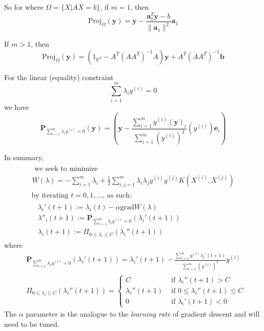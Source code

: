 \documentclass[10pt]{amsart}
\begin{document}
\begin{multicols*}{2}
So for where $\Omega = \lbrace X | AX = b \rbrace$, if $m=1$, then
\[
\text{Proj}_{\Omega}(\mathbf{y}) = \mathbf{y} - \frac{\mathbf{a}_1^T \mathbf{y} - b}{ \| \mathbf{a}_1 \|^2 } \mathbf{a}_1
\]

If $m>1$, then
\[
\text{Proj}_{\Omega}(\mathbf{y}) = (1_{\mathbb{R}^d} - A^T(AA^T)^{-1}A)\mathbf{y}+A^T(AA^T)^{-1}\mathbf{b}
\]

For the linear (equality) constraint
\[
\sum_{i=1}^m \lambda_iy^{(i)} = 0 
\]
we have
\begin{equation}
  \mathbf{P}_{\sum_{i=1}^m\lambda_iy^{(i)} = 0 }(\mathbf{y}) = \left( \mathbf{y} - \frac{ \sum_{i=1}^m y^{(i)} (\mathbf{y})_i }{ \sum_{i=1}^m (y^{(i)})^2 } (y^{(i)})\mathbf{e}_i \right)
  \end{equation}


In summary,
\begin{equation}\label{Eq:DualFormulationW}
\boxed{ \begin{gathered}
  \begin{gathered}
    \text{ we seek to minimize } \\
    W(\lambda) = - \sum_{i=1}^m \lambda_i + \frac{1}{2} \sum_{i,j=1}^m \lambda_i \lambda_j y^{(i)} y^{(j)} K(X^{(i)},X^{(j)}) 
  \end{gathered} \\
  \text{  by iterating $t=0,1,\dots $, as such: } \\
  \begin{aligned}
    & \lambda_i'(t+1):=\lambda_i(t) - \alpha \text{grad}{ W(\lambda) } \\ 
    & \lambda''_i(t+1):= \mathbf{P}_{\sum_{i=1}^m \lambda_i y^{(i)} = 0 }( \lambda_i'(t+1)) \\ 
    & \lambda_i(t+1) := \Pi_{0\leq \lambda_i \leq C}(\lambda_i''(t+1))
    \end{aligned}
\end{gathered} }
\end{equation}
where
\begin{equation}\label{Eq:ProjectionOpsAlgo}
\boxed{ \begin{aligned}
& \mathbf{P}_{\sum_{i=1}^m \lambda_i y^{(i)} = 0 }( \lambda_i'(t+1)) = \lambda_i'(t+1) - \frac{ \sum_{i=1}^m y^{(i)}\lambda_i'(t+1) }{ \sum_{i=1}^m (y^{(i)})^2 } y^{(i)} \\ 
  & \Pi_{0\leq \lambda_i \leq C}(\lambda_i''(t+1)) = \begin{cases} C & \text{ if } \lambda_i''(t+1) > C \\
    \lambda_i''(t+1) & \text{ if } 0 \leq \lambda_i''(t+1) \leq C \\
    0 & \text{ if } \lambda_i'(t+1) <0 \end{cases}
\end{aligned} }
\end{equation}
The $\alpha$ parameter is the analogue to the \emph{learning rate} of gradient descent and will need to be tuned.  


\end{multicols*}
\end{document}
